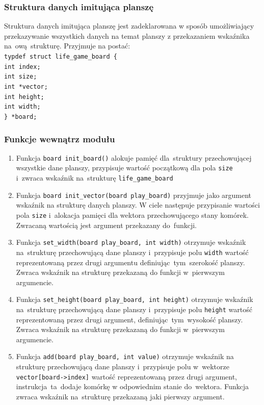 \documentclass[a4paper,11pt]{article}
\begin{document}
			\subsubsection{Struktura danych imitująca planszę}
				Struktura danych imitująca planszę jest zadeklarowana w sposób umożliwiający przekazywanie wszystkich danych na temat planszy z przekazaniem wskaźnika na~ową~strukturę.
				Przyjmuje na postać: \\
				\texttt{typdef struct life\_game\_board \{\\
				 \indent int index;\\
				 \indent int size;\\
				 \indent int *vector;\\
				 \indent int height;\\
				 \indent int width;\\
				\} *board; }
			
				\subsubsection{Funkcje wewnątrz modułu}
					\begin{enumerate}
					\item Funkcja \texttt{board init\_board()} alokuje pamięć dla~struktury przechowującej wszystkie dane planszy, przypisuje wartość początkową dla pola \texttt{size} i~zwraca wskaźnik na~strukturę  \texttt{life\_game\_board}
					\item Funkcja \texttt{board init\_vector(board play\_board)} przyjmuje jako argument wskaźnik na strukturę danych planszy. W ciele następuje przypisanie wartości pola \texttt{size} i~alokacja pamięci dla wektora przechowującego stany komórek. Zwracaną wartością jest argument przekazany do~funkcji.
					\item Funkcja \texttt{set\_width(board play\_board, int width)} otrzymuje wskaźnik na~strukturę przechowującą dane planszy i~przypisuje polu \texttt{width} wartość reprezentowaną przez drugi argumentu definiując~tym~szerokość planszy.
					Zwraca wskaźnik na strukturę przekazaną do funkcji w~pierwszym argumencie.
					\item Funkcja \texttt{set\_height(board play\_board, int height)} otrzymuje wskaźnik na~strukturę przechowującą dane planszy i~przypisuje polu \texttt{height} wartość reprezentowaną przez drugi argument, definiując~tym~wysokość planszy.
					Zwraca wskaźnik na strukturę przekazaną do funkcji w~pierwszym argumencie.
					\item Funkcja \texttt{add(board play\_board, int value)}  otrzymuje wskaźnik na strukturę przechowującą dane planszy i~przypisuje polu w~wektorze \texttt{vector[board->index]} wartość reprezentowaną przez drugi argument, instrukcja~ta~dodaje komórkę w odpowiednim stanie do~wektora. Funkcja zwraca wskaźnik na~strukturę przekazaną jaki pierwszy argument.
				\end{enumerate}
\end{document}
